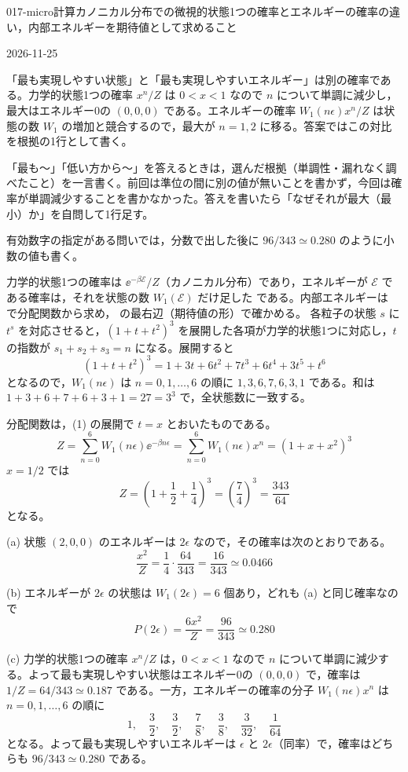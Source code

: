 \documentclass[uplatex,dvipdfmx,a4paper,11pt]{jsarticle}
\begin{document}
\begin{mondai}{017-micro}{計算}{カノニカル分布での微視的状態1つの確率とエネルギーの確率の違い，内部エネルギーを期待値として求めること}
\begin{kotaeutsushi}{2026-11-25}
\end{kotaeutsushi}
\begin{kizuki}
\item 「最も実現しやすい状態」と「最も実現しやすいエネルギー」は別の確率である。力学的状態1つの確率 $x^{n}/Z$ は $0<x<1$ なので $n$ について単調に減少し，最大はエネルギー0の $(0,0,0)$ である。エネルギーの確率 $W_{1}(n\epsilon)x^{n}/Z$ は状態の数 $W_{1}$ の増加と競合するので，最大が $n=1,2$ に移る。答案ではこの対比を根拠の1行として書く。
\item {} 「最も〜」「低い方から〜」を答えるときは，選んだ根拠（単調性・漏れなく調べたこと）を一言書く。前回は準位の間に別の値が無いことを書かず，今回は確率が単調減少することを書かなかった。答えを書いたら「なぜそれが最大（最小）か」を自問して1行足す。
\item 有効数字の指定がある問いでは，分数で出した後に $96/343\simeq\num{0.280}$ のように小数の値も書く。
\end{kizuki}
\begin{tadashii}
\houshin 力学的状態1つの確率は $\ee^{-\beta\mathcal{E}}/Z$（カノニカル分布）であり，エネルギーが $\mathcal{E}$ である確率は，それを状態の数 $W_{1}(\mathcal{E})$ だけ足した  である。内部エネルギーは  で分配関数から求め， の最右辺（期待値の形）で確かめる。
\keisan {} 各粒子の状態 $s$ に $t^{s}$ を対応させると，$(1+t+t^{2})^{3}$ を展開した各項が力学的状態1つに対応し，$t$ の指数が $s_{1}+s_{2}+s_{3}=n$ になる。展開すると
\[ (1+t+t^{2})^{3}=1+3t+6t^{2}+7t^{3}+6t^{4}+3t^{5}+t^{6} \]
となるので，$W_{1}(n\epsilon)$ は $n=0,1,\dots,6$ の順に $1,3,6,7,6,3,1$ である。和は $1+3+6+7+6+3+1=27=3^{3}$ で，全状態数に一致する。

 分配関数は，(1) の展開で $t=x$ とおいたものである。
\[ Z=\sum_{n=0}^{6}W_{1}(n\epsilon)\ee^{-\beta n\epsilon}=\sum_{n=0}^{6}W_{1}(n\epsilon)x^{n}=(1+x+x^{2})^{3} \]
$x=1/2$ では
\[ Z=\left(1+\frac{1}{2}+\frac{1}{4}\right)^{3}=\left(\frac{7}{4}\right)^{3}=\frac{343}{64} \]
となる。

(a) 状態 $(2,0,0)$ のエネルギーは $2\epsilon$ なので，その確率は次のとおりである。
\[ \frac{x^{2}}{Z}=\frac{1}{4}\cdot\frac{64}{343}=\frac{16}{343}\simeq\num{0.0466} \]

(b) エネルギーが $2\epsilon$ の状態は $W_{1}(2\epsilon)=6$ 個あり，どれも (a) と同じ確率なので
\[ P(2\epsilon)=\frac{6x^{2}}{Z}=\frac{96}{343}\simeq\num{0.280} \]

(c) 力学的状態1つの確率 $x^{n}/Z$ は，$0<x<1$ なので $n$ について単調に減少する。よって最も実現しやすい状態はエネルギー0の $(0,0,0)$ で，確率は $1/Z=64/343\simeq\num{0.187}$ である。一方，エネルギーの確率の分子 $W_{1}(n\epsilon)x^{n}$ は $n=0,1,\dots,6$ の順に
\[ 1,\quad\frac{3}{2},\quad\frac{3}{2},\quad\frac{7}{8},\quad\frac{3}{8},\quad\frac{3}{32},\quad\frac{1}{64} \]
となる。よって最も実現しやすいエネルギーは $\epsilon$ と $2\epsilon$（同率）で，確率はどちらも $96/343\simeq\num{0.280}$ である。


\end{tadashii}
\end{mondai}
\end{document}
